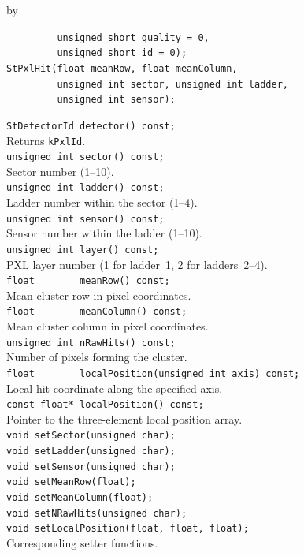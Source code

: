 \documentclass[twoside]{article}
\newcommand{\entrylabel}[1]{\mbox{\textbf{{#1}}}\hfil}%
\newenvironment{entry}
{\begin{list}{}%
    {\renewcommand{\makelabel}{\entrylabel}%
     \setlength{\labelwidth}{90pt}%
     \setlength{\leftmargin}{\labelwidth}
     \advance\leftmargin by \labelsep%
      }%
    }%
  {\end{list}}
\newcommand{\Entrylabel}[1]%
{\raisebox{0pt}[1ex][0pt]{\makebox[\labelwidth][l]%
    {\parbox[t]{\labelwidth}{\hspace{0pt}\textbf{{#1}}}}}}
\newenvironment{Entry}%
{\renewcommand{\entrylabel}{\Entrylabel}\begin{entry}}%
  {\end{entry}}
\begin{document}
\begin{Entry}
    \verb+         unsigned short quality = 0,+\\
    \verb+         unsigned short id = 0);+\\
    \verb+StPxlHit(float meanRow, float meanColumn,+\\
    \verb+         unsigned int sector, unsigned int ladder,+\\
    \verb+         unsigned int sensor);+\\
\item[Public Member\\ Functions]
    \verb+StDetectorId detector() const;+\\
    Returns \verb+kPxlId+.\\
    \verb+unsigned int sector() const;+\\
    Sector number (1--10).\\
    \verb+unsigned int ladder() const;+\\
    Ladder number within the sector (1--4).\\
    \verb+unsigned int sensor() const;+\\
    Sensor number within the ladder (1--10).\\
    \verb+unsigned int layer() const;+\\
    PXL layer number (1 for ladder~1, 2 for ladders~2--4).\\
    \verb+float        meanRow() const;+\\
    Mean cluster row in pixel coordinates.\\
    \verb+float        meanColumn() const;+\\
    Mean cluster column in pixel coordinates.\\
    \verb+unsigned int nRawHits() const;+\\
    Number of pixels forming the cluster.\\
    \verb+float        localPosition(unsigned int axis) const;+\\
    Local hit coordinate along the specified axis.\\
    \verb+const float* localPosition() const;+\\
    Pointer to the three-element local position array.\\
    \verb+void setSector(unsigned char);+\\
    \verb+void setLadder(unsigned char);+\\
    \verb+void setSensor(unsigned char);+\\
    \verb+void setMeanRow(float);+\\
    \verb+void setMeanColumn(float);+\\
    \verb+void setNRawHits(unsigned char);+\\
    \verb+void setLocalPosition(float, float, float);+\\
    Corresponding setter functions.\\
\end{Entry}
\clearpage
\end{document}

